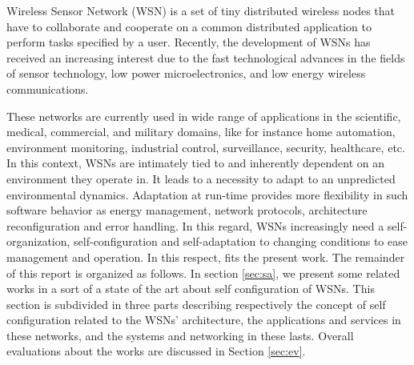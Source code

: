 
Wireless Sensor Network (WSN) is a set of tiny distributed wireless nodes that
have to collaborate and cooperate on a common distributed application to perform
tasks specified by a user.  Recently, the development of WSNs has received an
increasing interest due to the fast technological advances in the fields of
sensor technology, low power microelectronics, and low energy wireless
communications.

These networks are currently used in wide range of applications in the
scientific, medical, commercial, and military domains, like for instance home
automation, environment monitoring, industrial control, surveillance, security,
healthcare, etc.  In this context, WSNs are intimately tied to and inherently
dependent on an environment they operate in. It leads to a necessity to adapt to
an unpredicted environmental dynamics. Adaptation at run-time provides more
flexibility in such software behavior as energy management, network protocols,
architecture reconfiguration and error handling.  In this regard, WSNs
increasingly need a self-organization, self-configuration and self-adaptation to
changing conditions to ease management and operation.  In this respect, fits the
present work. The remainder of this report is organized as follows. In section
\ref{sec:sa}, we present some related works in a sort of a state of the art
about self configuration of WSNs. This section is subdivided in three parts
describing respectively the concept of self configuration related to the WSNs’
architecture, the applications and services in these networks, and the systems
and networking in these lasts. Overall evaluations about the works are
discussed in Section \ref{sec:ev}.
